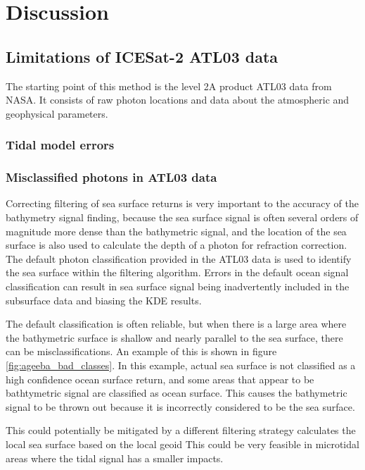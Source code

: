 \chapter{Discussion}

\section{Limitations of ICESat-2 ATL03 data}
The starting point of this method is the level 2A product ATL03 data from NASA. It consists of raw photon locations and data about the atmospheric and geophysical parameters. 

\subsection{Tidal model errors}
\subsection{Misclassified photons in ATL03 data}

Correcting filtering of sea surface returns is very important to the accuracy of the bathymetry signal finding, because the sea surface signal is often several orders of magnitude more dense than the bathymetric signal, and the location of the sea surface is also used to calculate the depth of a photon for refraction correction. The default photon classification provided in the ATL03 data is used to identify the sea surface within the filtering algorithm. Errors in the default ocean signal classification can result in sea surface signal being inadvertently included in the subsurface data and biasing the KDE results.

The default classification is often reliable, but when there is a large area where the bathymetric surface is shallow and nearly parallel to the sea surface, there can be misclassifications. An example of this is shown in figure \ref{fig:ageeba_bad_classes}. In this example, actual sea surface is not classified as a high confidence ocean surface return, and some areas that appear to be bathtymetric signal are classified as ocean surface. This causes the bathymetric signal to be thrown out because it is incorrectly considered to be the sea surface.

This could potentially be mitigated by a different filtering strategy calculates the local sea surface based on the local geoid  This could be very feasible in microtidal areas where the tidal signal has a smaller impacts.


